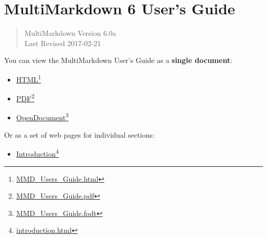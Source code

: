 
\def\mytitle{MultiMarkdown 6 User's Guide}
\def\myauthor{Fletcher T. Penney}
\def\version{6.0a}
\def\revised{2017-02-21}
\def\keywords{MultiMarkdown, Markdown, LaTeX, PDF, RTF, LyX, HTML}


\chapter{MultiMarkdown 6 User's Guide }
\label{title}

\begin{quote}
MultiMarkdown Version 6.0a\\
Last Revised 2017-02-21
\end{quote}

You can view the MultiMarkdown User's Guide as a \textbf{single document}:

\begin{itemize}
\item \href{MMD_Users_Guide.html}{HTML}\footnote{\href{MMD_Users_Guide.html}{MMD\_Users\_Guide.html}}

\item \href{MMD_Users_Guide.pdf}{PDF}\footnote{\href{MMD_Users_Guide.pdf}{MMD\_Users\_Guide.pdf}}

\item \href{MMD_Users_Guide.fodt}{OpenDocument}\footnote{\href{MMD_Users_Guide.fodt}{MMD\_Users\_Guide.fodt}}

\end{itemize}

Or as a set of web pages for individual sections:

\begin{itemize}
\item \href{introduction.html}{Introduction}\footnote{\href{introduction.html}{introduction.html}}

\end{itemize}




